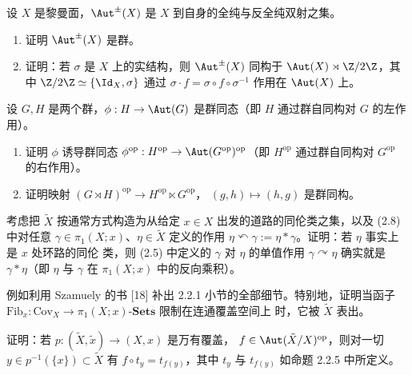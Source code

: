 \begin{exercise}\label{ex:2.2.23}
设 $X$ 是黎曼面，$\Aut^{\pm}(X)$ 是 $X$ 到自身的全纯与反全纯双射之集。
\begin{enumerate}[label=(\roman*), leftmargin=2.2em, itemsep=0.15em]
\item 证明 $\Aut^{\pm}(X)$ 是群。
\item 证明：若 $\sigma$ 是 $X$ 上的实结构，则 $\Aut^{\pm}(X)$ 同构于
      $\Aut(X)\rtimes\Z/2\Z$，其中 $\Z/2\Z\simeq\{\Id_X,\sigma\}$ 通过
      $\sigma\cdot f=\sigma\circ f\circ\sigma^{-1}$ 作用在 $\Aut(X)$ 上。
\end{enumerate}
\end{exercise}

\begin{exercise}\label{ex:2.2.24}
设 $G,H$ 是两个群，$\phi:H\to\Aut(G)$ 是群同态（即 $H$ 通过群自同构对 $G$ 的左作用）。
\begin{enumerate}[label=(\roman*), leftmargin=2.2em, itemsep=0.15em]
\item 证明 $\phi$ 诱导群同态 $\phi^{\mathrm{op}}:H^{\mathrm{op}}\to
      \Aut(G^{\mathrm{op}})^{\mathrm{op}}$（即 $H^{\mathrm{op}}$ 通过群自同构对
      $G^{\mathrm{op}}$ 的右作用）。
\item 证明映射 $(G\rtimes H)^{\mathrm{op}}\to H^{\mathrm{op}}\ltimes G^{\mathrm{op}}$，
      $(g,h)\mapsto(h,g)$ 是群同构。
\end{enumerate}
\end{exercise}

\begin{exercise}\label{ex:2.2.25}
考虑把 $\tilde X$ 按通常方式构造为从给定 $x\in X$ 出发的道路的同伦类之集，以及 (2.8)
中对任意 $\gamma\in\pi_1(X;x)$、$\eta\in\tilde X$ 定义的作用
$\eta\curvearrowleft\gamma:=\eta*\gamma$。证明：若 $\eta$ 事实上是 $x$ 处环路的同伦
类，则 (2.5) 中定义的 $\gamma$ 对 $\eta$ 的单值作用 $\gamma\curvearrowright\eta$
确实就是 $\gamma*\eta$（即 $\eta$ 与 $\gamma$ 在 $\pi_1(X;x)$ 中的反向乘积）。
\end{exercise}

\begin{exercise}\label{ex:2.2.26}
例如利用 Szamuely 的书 [18] 补出 2.2.1 小节的全部细节。特别地，证明当函子
$\mathrm{Fib}_x:\mathrm{Cov}_X\to\pi_1(X;x)\text{-}\mathbf{Sets}$ 限制在连通覆盖空间上
时，它被 $\tilde X$ 表出。
\end{exercise}

\begin{exercise}\label{ex:2.2.27}
证明：若 $p:(\tilde X,\tilde x)\to(X,x)$ 是万有覆盖，
$f\in\Aut(\tilde X/X)^{\mathrm{op}}$，则对一切 $y\in p^{-1}(\{x\})\subset\tilde X$ 有
$f\circ t_y=t_{f(y)}$，其中 $t_y$ 与 $t_{f(y)}$ 如命题 2.2.5 中所定义。
\end{exercise}

